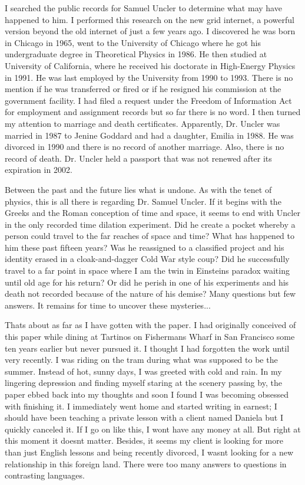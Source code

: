 I searched the public records for Samuel Uncler to determine what may
have happened to him. I performed this research on the new grid
internet, a powerful version beyond the old internet of just a few years
ago. I discovered he was born in Chicago in 1965, went to the University
of Chicago where he got his undergraduate degree in Theoretical Physics
in 1986. He then studied at University of California, where he received
his doctorate in High-Energy Physics in 1991. He was last employed by
the University from 1990 to 1993. There is no mention if he was
transferred or fired or if he resigned his commission at the government
facility. I had filed a request under the Freedom of Information Act for
employment and assignment records but so far there is no word. I then
turned my attention to marriage and death certificates. Apparently, Dr.
Uncler was married in 1987 to Jenine Goddard and had a daughter, Emilia
in 1988. He was divorced in 1990 and there is no record of another
marriage. Also, there is no record of death. Dr. Uncler held a passport
that was not renewed after its expiration in 2002.

Between the past and the future lies what is undone. As with the tenet
of physics, this is all there is regarding Dr. Samuel Uncler. If it
begins with the Greeks and the Roman conception of time and space, it
seems to end with Uncler in the only recorded time dilation experiment.
Did he create a pocket whereby a person could travel to the far reaches
of space and time? What has happened to him these past fifteen years?
Was he reassigned to a classified project and his identity erased in a
cloak-and-dagger Cold War style coup? Did he successfully travel to a
far point in space where I am the twin in Einstein\textquotesingle s
paradox waiting until old age for his return? Or did he perish in one of
his experiments and his death not recorded because of the nature of his
demise? Many questions but few answers. It remains for time to uncover
these mysteries...

That\textquotesingle s about as far as I have gotten with the paper. I
had originally conceived of this paper while dining at
Tartino\textquotesingle s on Fisherman\textquotesingle s Wharf in San
Francisco some ten years earlier but never pursued it. I thought I had
forgotten the work until very recently. I was riding on the tram during
what was supposed to be the summer. Instead of hot, sunny days, I was
greeted with cold and rain. In my lingering depression and finding
myself staring at the scenery passing by, the paper ebbed back into my
thoughts and soon I found I was becoming obsessed with finishing it. I
immediately went home and started writing in earnest; I should have been
teaching a private lesson with a client named Daniela but I quickly
canceled it. If I go on like this, I won\textquotesingle t have any
money at all. But right at this moment it doesn\textquotesingle t
matter. Besides, it seems my client is looking for more than just
English lessons and being recently divorced, I wasn\textquotesingle t
looking for a new relationship in this foreign land. There were too many
answers to questions in contrasting languages.

